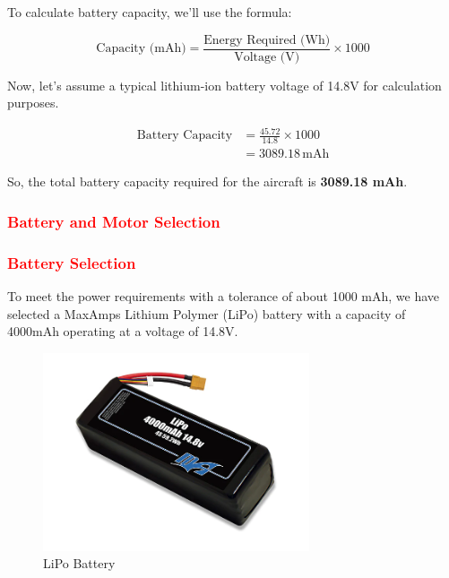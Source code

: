 \documentclass[12 pt]{article}
\begin{document}
To calculate battery capacity, we'll use the formula:

\[
\text{Capacity (mAh)} = \frac{\text{Energy Required (Wh)}}{\text{Voltage (V)}} \times 1000
\]


Now, let's assume a typical lithium-ion battery voltage of 14.8V for calculation purposes.

\begin{align}
\text{Battery Capacity} &= \frac{45.72}{14.8} \times 1000 \\
& = 3089.18 \, \text{mAh}
\end{align}

So, the total battery capacity required for the aircraft is \textbf{3089.18 mAh}.

\subsubsection{\textcolor{red}{Battery and Motor Selection}}

\subsubsection{\textcolor{red}{Battery Selection}}

To meet the power requirements with a tolerance of about 1000 mAh, we have selected a MaxAmps Lithium Polymer (LiPo) battery with a capacity of 4000mAh operating at a voltage of 14.8V.

\begin{figure}[h]
    \centering
    \includegraphics[width=0.7\textwidth]{LiPo-4000-4S-14.8v-Battery-Pack.jpg}
    \caption{LiPo Battery}
    \label{fig:battery}
\end{figure}
\end{document}
